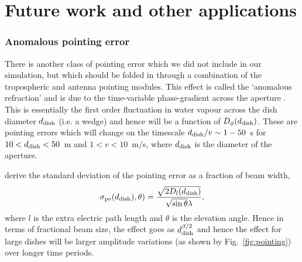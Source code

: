 




\section{Future work and other applications}\label{sec:improv}

\subsubsection{Anomalous pointing error}
There is another class of pointing error which we did not include in our simulation, but which should be folded in through a combination of the tropospheric and antenna pointing modules. This effect is called the `anomalous refraction' and is due to the time-variable phase-gradient across the aperture \citep[e.g.][]{Holdaway_1997,Butler_1997,Holdaway_1998}. This is essentially the first order fluctuation in water vapour across the dish diameter $d_{\rm dish}$ (i.e. a wedge) and hence will be a function of $D_{\phi}(d_{\rm dish})$. These are pointing errors which will change on the timescale $d_{\rm dish}/v \sim 1-50$~s for $10<d_{\rm dish}<50$~m and $1<v<10$~m/s, where $d_{\rm dish}$ is the diameter of the aperture.  

\citet{Holdaway_1998} derive the standard deviation of the pointing error as a fraction of beam width,
\begin{equation}
 \sigma_{\rm pe}(d_{\rm dish}),\theta) = \frac{\sqrt{2 D_l(d_{\rm dish})}}{\sqrt{\sin\theta}\lambda},
\end{equation}
where $l$ is the extra electric path length and $\theta$ is the elevation angle. Hence in terms of fractional beam size, the effect goes as $d_{\rm dish}^{\beta/2}$ and hence the effect for large dishes will be larger amplitude variations (as shown by Fig.~\ref{fig:pointing}) over longer time periods. 


